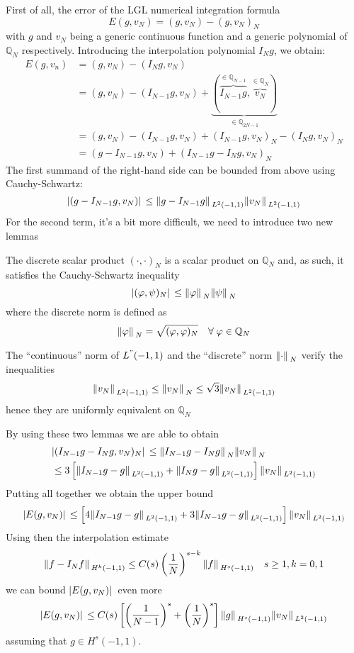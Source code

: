 First of all, the error of the LGL numerical integration formula 
\[
    E(g, v_N) = (g, v_N) - (g, v_N)_N
\]
with \(g\) and \(v_N\) being a generic continuous function and a generic polynomial of \(\mathbb{Q}_N\) respectively. Introducing the interpolation polynomial \(I_Ng\), we obtain:
\begin{align*}
    E(g, v_n) &= (g, v_N) - (I_Ng, v_N) \\
    &= (g, v_N) - (I_{N-1}g, v_N) + \underbrace{(\overbrace{I_{N-1}g}^{\in \mathbb{Q}_{N-1}}, \overbrace{v_N}^{\in \mathbb{Q}_N})}_{\in \mathbb{Q}_{2N-1}} \\
    &= (g, v_N) - (I_{N-1}g, v_N) +(I_{N-1}g, v_N)_N - (I_{N}g, v_N)_N \\
    &= (g - I_{N-1}g, v_N) + (I_{N-1}g - I_N g, v_N)_N
\end{align*}
The first summand of the right-hand side can be bounded from above using Cauchy-Schwartz:
\[
    \abs*{(g-I_{N-1}g, v_N)} \leq \norm*{g-I_{N-1}g}_{L^2(-1,1)}\norm*{v_N}_{L^2(-1,1)}
\]
For the second term, it's a bit more difficult, we need to introduce two new lemmas
\begin{lemma}
    The discrete scalar product \((\cdot, \cdot)_N\) is a scalar product on \(\mathbb{Q}_N\) and, as such, it satisfies the Cauchy-Schwartz inequality
    \[
        \abs*{(\varphi, \psi)_N} \leq \norm*{\varphi}_N \norm*{\psi}_N
    \]
    where the discrete norm is defined as 
    \[
        \norm*{\varphi}_N = \sqrt{(\varphi, \varphi)_N} \quad \forall \; \varphi \in \mathbb{Q}_N
    \]
\end{lemma}
\begin{lemma}
    The ``continuous'' norm of \(L^"(-1,1)\) and the ``discrete'' norm \(\norm*{\cdot}_N\) verify the inequalities
    \[
        \norm*{v_N}_{L^2(-1,1)} \leq \norm*{v_N}_N \leq \sqrt{3}\norm*{v_N}_{L^2(-1,1)}
    \]
    hence they are uniformly equivalent on \(\mathbb{Q}_N\)
\end{lemma}
By using these two lemmas we are able to obtain 
\begin{equation*}
    \begin{split}
        &\abs*{(I_{N-1}g - I_Ng, v_N)_N} \leq \norm*{I_{N-1}g - I_Ng}_N \norm*{v_N}_N  \\
        &\leq 3 \left[\norm*{I_{N-1}g-g}_{L^2(-1,1)} + \norm*{I_{N}g-g}_{L^2(-1,1)}\right] \norm*{v_N}_{L^2(-1,1)}
    \end{split}
\end{equation*}
Putting all together we obtain the upper bound 
\[
    \abs*{E(g,v_N)} \leq \left[4\norm*{I_{N-1}g-g}_{L^2(-1,1)} + 3 \norm*{I_{N-1}g-g}_{L^2(-1,1)} \right] \norm*{v_N}_{L^2(-1,1)}
\]
Using then the interpolation estimate 
\[
    \norm*{f- I_Nf}_{H^k(-1,1)} \leq C(s)\left(\frac{1}{N}\right)^{s-k} \norm*{f}_{H^s(-1,1)} \quad s \geq 1, k = 0,1
\]
we can bound \(\abs*{E(g,v_N)}\) even more
\[
    \abs*{E(g,v_N)} \leq C(s)\left[\left(\frac{1}{N-1}\right)^s + \left(\frac{1}{N}\right)^s\right] \norm*{g}_{H^s(-1,1)} \norm*{v_N}_{L^2(-1,1)}
\]
assuming that \(g \in H^s(-1,1)\).

